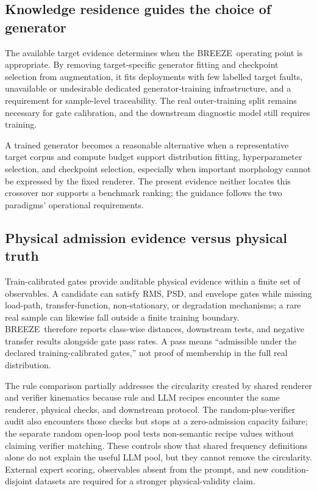 \documentclass[a4paper,fleqn]{cas-sc}
\newcommand{\breeze}{BREEZE}
\begin{document}
\subsection{Knowledge residence guides the choice of generator}

The available target evidence determines when the \breeze\ operating point is
appropriate. By removing target-specific generator fitting and checkpoint
selection from augmentation, it fits deployments with few labelled target
faults, unavailable or undesirable dedicated generator-training infrastructure,
and a requirement for sample-level traceability. The real outer-training split
remains necessary for gate calibration, and the downstream diagnostic model
still requires training.

A trained generator becomes a reasonable alternative when a representative
target corpus and compute budget support distribution fitting, hyperparameter
selection, and checkpoint selection, especially when important morphology
cannot be expressed by the fixed renderer. The present evidence neither locates
this crossover nor supports a benchmark ranking; the guidance follows the two
paradigms' operational requirements.

\subsection{Physical admission evidence versus physical truth}

Train-calibrated gates provide auditable physical evidence within a finite set
of observables. A candidate can satisfy RMS, PSD, and envelope gates while
missing load-path, transfer-function, non-stationary, or degradation
mechanisms; a rare real sample can likewise fall outside a finite training
boundary. \breeze\ therefore reports class-wise distances, downstream tests,
and negative transfer results alongside gate pass rates. A pass means
``admissible under the declared training-calibrated gates,'' not proof of
membership in the full real distribution.

The rule comparison partially addresses the circularity created by shared
renderer and verifier kinematics because rule and LLM recipes encounter the
same renderer, physical checks, and downstream protocol. The
random-plus-verifier audit also encounters those checks but stops at a
zero-admission capacity failure; the separate random open-loop pool tests
non-semantic recipe values without claiming verifier matching. These controls
show that shared frequency definitions alone do not explain the useful LLM
pool, but they cannot remove the circularity. External expert scoring,
observables absent from the prompt, and new condition-disjoint datasets are
required for a stronger physical-validity claim.
\end{document}
